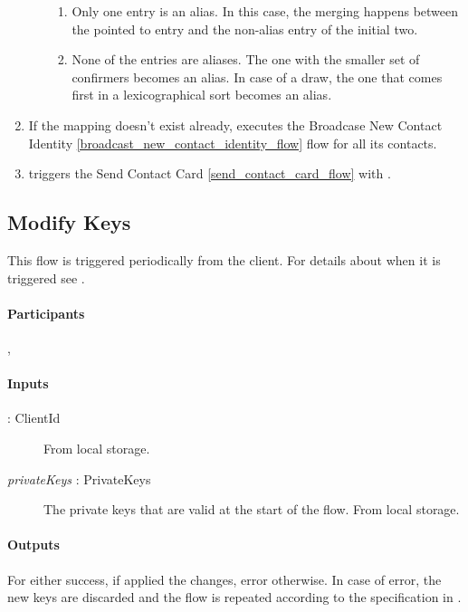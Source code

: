 \documentclass[a4paper,10pt]{article}
\newcommand{\privateKeys}{\emph{privateKeys}}
\newcommand{\identity}[1]{\parenthesize{identity}{#1}}
\begin{document}
\begin{enumerate}[resume]
\begin{enumerate}
\begin{enumerate}
    \item Only one entry is an alias. In this case, the merging happens between the pointed to entry and the non-alias entry of the initial two.
    \item None of the entries are aliases. The one with the smaller set of confirmers becomes an alias. In case of a draw, the one that comes first in a lexicographical sort 
becomes an alias.
  \end {enumerate}
 \end{enumerate}
 \item If the mapping doesn't exist already,  executes the Broadcase New Contact Identity \ref{broadcast_new_contact_identity_flow} flow for all its contacts.
 \item {} triggers the Send Contact Card \ref{send_contact_card_flow} with .
\end{enumerate}

\subsection{Modify Keys}
\label{modify_keys_flow}
This flow is triggered periodically from the client. For details about when it is triggered see \cite{crypto_spec}.

\paragraph{Participants} , \Server{}

\paragraph{Inputs}
\SpecialItem
\begin{description}
 \item[\identity{A} : ClientId] From  local storage.
 \item[\privateKeys{} : PrivateKeys] The private keys that are valid at the start of the flow. From  local storage.
\end{description}

\paragraph{Outputs}
For  either success, if \Server{} applied the changes, error otherwise. In case of error, the new keys are discarded and the flow is repeated according to the 
specification in \cite{crypto_spec}.
\end{document}
